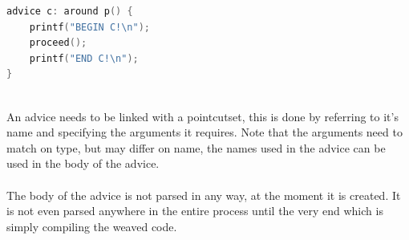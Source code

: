\documentclass[a4paper]{report}
\begin{document}
\begin{minipage}{0.42\textwidth}
\begin{lstlisting}[language=C, caption=Example of an around advice, label=lst:SmallC_AroundAdvice]
advice c: around p() {
	printf("BEGIN C!\n");
	proceed();
	printf("END C!\n");
}
\end{lstlisting}
\end{minipage}\\
An advice needs to be linked with a pointcutset, this is done by referring to it's name and specifying the arguments it requires. Note that the arguments need to match on type, but may differ on name, the names used in the advice can be used in the body of the advice.\\
\\
The body of the advice is not parsed in any way, at the moment it is created. It is not even parsed anywhere in the entire process until the very end which is simply compiling the weaved code.
\end{document}
